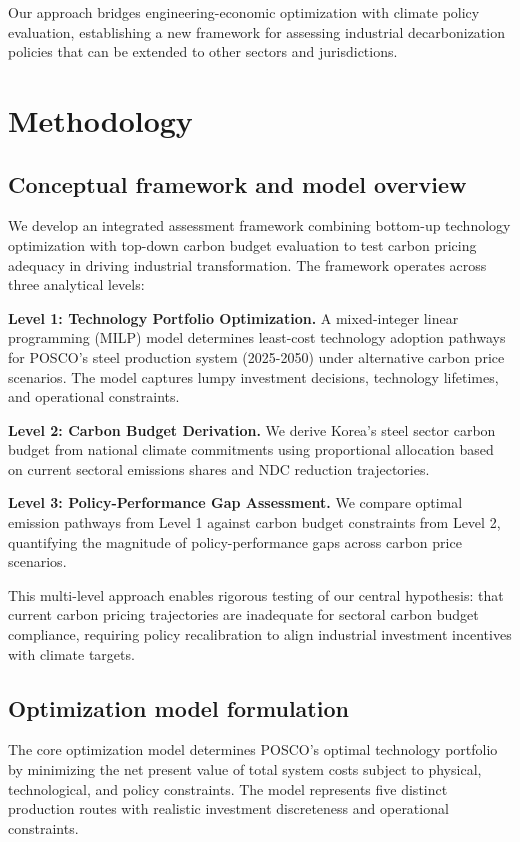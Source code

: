 \documentclass[preprint,1p,authoryear]{elsarticle}
\begin{document}
Our approach bridges engineering-economic optimization with climate policy evaluation, establishing a new framework for assessing industrial decarbonization policies that can be extended to other sectors and jurisdictions.

\section{Methodology}

\subsection{Conceptual framework and model overview}

We develop an integrated assessment framework combining bottom-up technology optimization with top-down carbon budget evaluation to test carbon pricing adequacy in driving industrial transformation. The framework operates across three analytical levels:

\textbf{Level 1: Technology Portfolio Optimization.} A mixed-integer linear programming (MILP) model determines least-cost technology adoption pathways for POSCO's steel production system (2025-2050) under alternative carbon price scenarios. The model captures lumpy investment decisions, technology lifetimes, and operational constraints.

\textbf{Level 2: Carbon Budget Derivation.} We derive Korea's steel sector carbon budget from national climate commitments using proportional allocation based on current sectoral emissions shares and NDC reduction trajectories.

\textbf{Level 3: Policy-Performance Gap Assessment.} We compare optimal emission pathways from Level 1 against carbon budget constraints from Level 2, quantifying the magnitude of policy-performance gaps across carbon price scenarios.

This multi-level approach enables rigorous testing of our central hypothesis: that current carbon pricing trajectories are inadequate for sectoral carbon budget compliance, requiring policy recalibration to align industrial investment incentives with climate targets.

\subsection{Optimization model formulation}

The core optimization model determines POSCO's optimal technology portfolio by minimizing the net present value of total system costs subject to physical, technological, and policy constraints. The model represents five distinct production routes with realistic investment discreteness and operational constraints.
\end{document}
